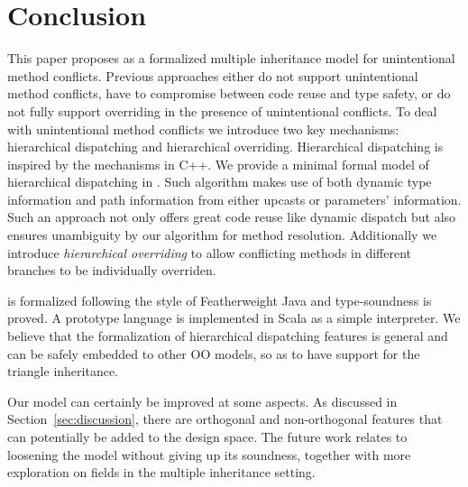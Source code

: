 \section{Conclusion}


This paper proposes \MIM{} as a formalized multiple inheritance model for
unintentional method conflicts. Previous approaches 
either do not support unintentional method conflicts, have to
compromise between code reuse and type safety, or do not fully support
overriding in the presence of unintentional conflicts. To deal with unintentional method conflicts we
introduce two key mechanisms: hierarchical dispatching and
hierarchical overriding. Hierarchical dispatching is inspired by the
mechanisms in C++. We provide a minimal formal model of hierarchical
dispatching in \MIM{}. Such algorithm makes use of both dynamic type
information and path information from either upcasts or parameters'
information. Such an approach not only offers great code reuse like
dynamic dispatch but also ensures unambiguity by our algorithm for
method resolution. Additionally we introduce \emph{hierarchical
  overriding} to allow conflicting methods in different branches to be
individually overriden.

\MIM{} is formalized following the style of
Featherweight Java and type-soundness is proved. A prototype language is
implemented in Scala as a simple interpreter. We believe that the formalization of
hierarchical dispatching features is general and
can be safely embedded to other OO models, so as to have support for the triangle
inheritance.

Our model can certainly be improved at some aspects. 
As discussed in Section~\ref{sec:discussion}, there are orthogonal and
non-orthogonal features that can potentially be added to the design space. 
The future work relates to loosening the model without giving up its soundness,
together with more exploration on fields in the multiple inheritance setting.
